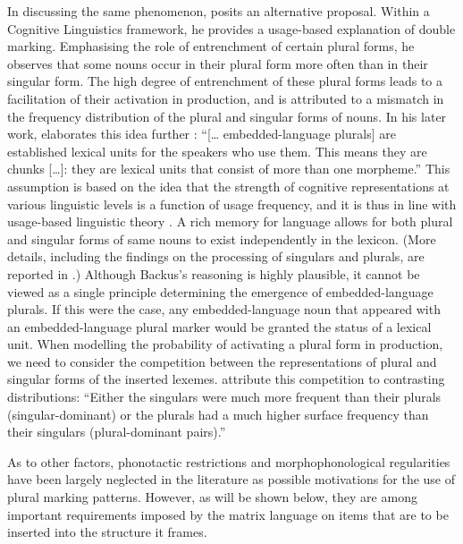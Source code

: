 In discussing the same phenomenon, \citet[151]{backus-two-1996} posits an alternative proposal. Within a Cognitive Linguistics framework, he provides a usage-based explanation of double marking. Emphasising the role of entrenchment of certain plural forms, he observes that some nouns occur in their plural form more often than in their singular form. The high degree of entrenchment of these plural forms leads to a facilitation of their activation in production, and is attributed to a mismatch in the frequency distribution of the plural and singular forms of nouns. In his later work, \citet[98]{backus-evidence-1999} elaborates this idea further : ``[\dots{} embedded-language plurals] are established lexical units for the speakers who use them. This means they are chunks [\dots{}]: they are lexical units that consist of more than one morpheme.'' This assumption is based on the idea that the strength of cognitive representations at various linguistic levels is a function of usage frequency, and it is thus in line with usage-based linguistic theory \citep{bybee-morphology-1985,bybee-repetition-2006,bybee-book-2010}. A rich memory for language \citep{langacker-foundations-1987,langacker00,tomasello-constructing-2003,bybee-book-2010} allows for both plural and singular forms of same nouns to exist independently in the lexicon. (More details, including the findings on the processing of singulars and plurals, are reported in .) Although Backus's reasoning is highly  plausible, it cannot be viewed as a single principle determining the emergence of embedded-language plurals. If this were the case, any embedded-language noun that appeared with an embedded-language plural marker would be granted the status of a lexical unit. When modelling the probability of activating a plural form in production, we need to consider the competition between the representations of plural and singular forms of the inserted lexemes. \citet[][97]{baayen-dijkstra-schreuder} attribute this competition to contrasting distributions: “Either the singulars were much more frequent than their plurals (singular-dominant) or the plurals had a much higher surface frequency than their singulars (plural-dominant pairs).”

As to other factors, phonotactic restrictions and morphophonological regularities have been largely neglected in the literature as possible motivations for the use of  plural marking patterns. However, as will be shown below, they are among important requirements imposed by the matrix language on items that are to be inserted into the structure it frames.


